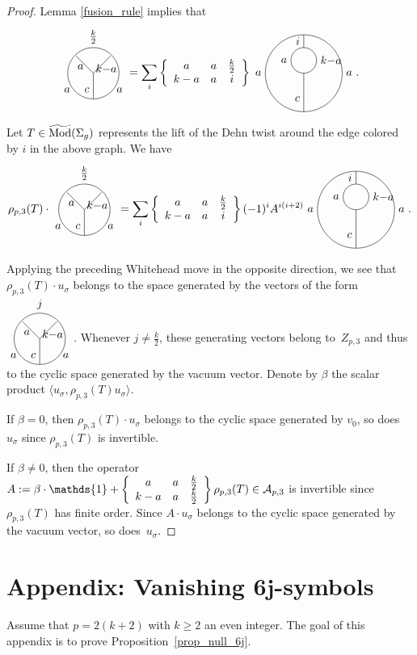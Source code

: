 \documentclass[pdftex]{sigma}
\numberwithin{equation}{section}
\begin{document}
\begin{proof}Lemma \ref{fusion_rule} implies that
\begin{equation*} \Tetahedrongraph{$\frac{k}{2}$}{$a$}{$k{-}a$}{$a$}{$c$}{$a$} = \sum_i \sixj{a}{a}{\frac{k}{2}}{k-a}{a}{i}
\tikz[scale=0.4,baseline=-0.5ex]{
\draw (0,1) circle (1);
\draw (0,0) circle (3);
\draw (0,0) --(0,-3);
\draw (0,2)--(0,3);
\draw (0, 2.5) node[left]{$i$};
\draw (-1, 1) node[left]{$a$};
\draw (1, 1) node[right]{$k{-}a$};
\draw (-3, 0) node[left]{$a$};
\draw (0,-2) node[left]{$c$};
\draw (3,0) node[right]{$a$};
}.
\end{equation*}

Let $T\in \widetilde{\operatorname{Mod}}(\Sigma_g)$ represents the lift of the Dehn twist around the edge colored by $i$ in the above graph. We have
\begin{equation*} \rho_{p,3}(T)\cdot \Tetahedrongraph{$\frac{k}{2}$}{$a$}{$k{-}a$}{$a$}{$c$}{$a$} = \sum_i \sixj{a}{a}{\frac{k}{2}}{k-a}{a}{i}(-1)^iA^{i(i+2)}
\tikz[scale=0.4,baseline=-0.5ex]{
\draw (0,1) circle (1);
\draw (0,0) circle (3);
\draw (0,0) --(0,-3);
\draw (0,2)--(0,3);
\draw (0, 2.5) node[left]{$i$};
\draw (-1, 1) node[left]{$a$};
\draw (1, 1) node[right]{$k{-}a$};
\draw (-3, 0) node[left]{$a$};
\draw (0,-2) node[left]{$c$};
\draw (3,0) node[right]{$a$};
}.\end{equation*}

Applying the preceding Whitehead move in the opposite direction, we see that $\rho_{p,3}(T)\cdot u_{\sigma}$ belongs to the space generated by the vectors of the form $\Tetahedrongraph{$j$}{$a$}{$k{-}a$}{$a$}{$c$}{$a$}$. Whenever $j\neq \frac{k}{2}$, these generating vectors belong to~$Z_{p,3}$ and thus to the cyclic space generated by the vacuum vector. Denote by $\beta$ the scalar product $\langle u_{\sigma}, \rho_{p,3}(T)u_{\sigma}\rangle$.

If $\beta=0$, then $\rho_{p,3}(T)\cdot u_{\sigma}$ belongs to the cyclic space generated by $v_0$, so does $u_{\sigma}$ since $\rho_{p,3}(T)$ is invertible.

If $\beta\neq 0$, then the operator $A:=\beta \cdot \mathds{1} + \sixj{a}{a}{\frac{k}{2}}{k-a}{a}{\frac{k}{2}} \rho_{p,3}(T) \in \mathcal{A}_{p,3}$ is invertible since~$\rho_{p,3}(T)$ has finite order. Since $A\cdot u_{\sigma}$ belongs to the cyclic space generated by the vacuum vector, so does~$u_{\sigma}$.
\end{proof}

\appendix

\section[Appendix: Vanishing $6j$-symbols]{Appendix: Vanishing $\boldsymbol{6j}$-symbols}\label{appendixA}
Assume that $p=2(k+2)$ with $k\geq 2$ an even integer. The goal of this appendix is to prove Proposition~\ref{prop_null_6j}.
\end{document}
